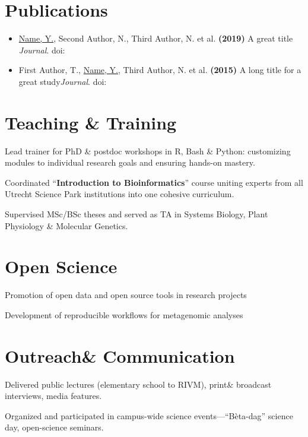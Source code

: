 \documentclass[a4paper,10pt]{article}
\begin{document}
\section*{Publications}
\begin{itemize}
\item \underline{Name, Y.}, Second Author, N., Third Author, N. et al. \textbf{(2019)} A great title {\it Journal}. doi:~
\item First Author, T., \underline{Name, Y.}, Third Author, N. et al. \textbf{(2015)} A long title for a great study{\it Journal}. doi:~
\end{itemize}

\section*{Teaching \& Training}
\begin{description}
\raggedright
\item[\normalfont \textcolor{ForestGreen}{\textbf{2022 -- now.}}] Lead trainer for PhD \& postdoc workshops in R, Bash \& Python: customizing modules to individual research goals and ensuring hands-on mastery.
\item[\normalfont \textcolor{ForestGreen}{\textbf{2020 -- 2021.}}] Coordinated “\textbf{Introduction to Bioinformatics}” course uniting experts from all Utrecht Science Park institutions into one cohesive curriculum.
\item[\normalfont \textcolor{ForestGreen}{\textbf{2017 -- 2022.}}] Supervised MSc/BSc theses and served as TA in Systems Biology, Plant Physiology \& Molecular Genetics.
\end{description}


\section*{Open Science}
\begin{description}
\raggedright
\item Promotion of open data and open source tools in research projects
\item Development of reproducible workflows for metagenomic analyses
\end{description}

\section*{Outreach\& Communication}
\begin{description}
\raggedright
\item Delivered public lectures (elementary school to RIVM), print\& broadcast interviews, media features.
\item Organized and participated in campus-wide science events—“Bèta-dag” science day, open-science seminars.
\end{description}
\end{document}
